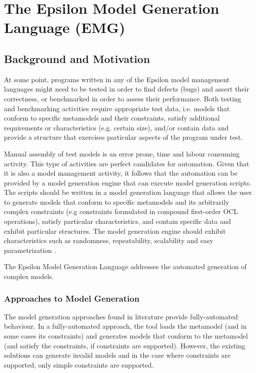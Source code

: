 \chapter{The Epsilon Model Generation Language (EMG)}
\label{sec:EMG}

\section{Background and Motivation}
At some point, programs written in any of the Epsilon model management languages might need to be tested in order to find defects (bugs) and assert their correctness, or benchmarked in order to assess their performance.
Both testing and benchmarking activities require appropriate test data, i.e. models that conform to specific metamodels and their constraints, satisfy additional requirements or characteristics (e.g. certain size), and/or contain data and provide a structure that exercises particular aspects of the program under test.

Manual assembly of test models is an error prone, time and labour consuming activity. This type of activities are perfect candidates for automation. Given that it is also a model management activity, it follows that the automation can be provided by a model generation engine that can execute model generation scripts. 
The scripts should be written in a model generation language that allows the user to generate models that conform to specific metamodels and its arbitrarily complex constraints (e.g constraints formulated in compound first-order OCL operations), satisfy particular characteristics, and contain specific data and exhibit particular structures. The model generation engine should exhibit characteristics such as randomness, repeatability, scalability and easy parametrization \cite{Baudry2010,Ferdjoukh2015}.

The Epsilon Model Generation Language  addresses the automated generation of complex models. 

\subsection{Approaches to Model Generation}

The model generation approaches found in literature provide fully-automated behaviour. In a fully-automated approach, the tool loads the metamodel (and in some cases its constraints) and generates models that conform to the metamodel (and satisfy the constraints, if constraints are supported).  However, the existing solutions can generate invalid models and in the case where constraints are supported, only simple constraints are supported.

